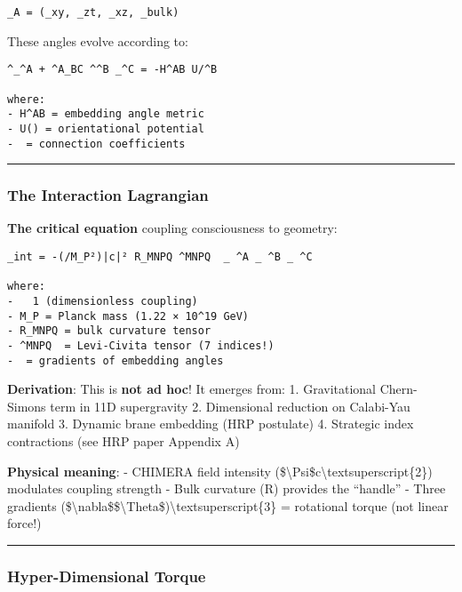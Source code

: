 \begin{verbatim}
_A = (_xy, _zt, _xz, _bulk)
\end{verbatim}

These angles evolve according to:

\begin{verbatim}
^_^A + ^A_BC ^^B _^C = -H^AB U/^B

where:
- H^AB = embedding angle metric
- U() = orientational potential
-  = connection coefficients
\end{verbatim}

\begin{center}\rule{0.5\linewidth}{0.5pt}\end{center}

\subsubsection{The Interaction
Lagrangian}\label{the-interaction-lagrangian}

\textbf{The critical equation} coupling consciousness to geometry:

\begin{verbatim}
_int = -(/M_P²)|c|² R_MNPQ ^MNPQ  _ ^A _ ^B _ ^C

where:
-   1 (dimensionless coupling)
- M_P = Planck mass (1.22 × 10^19 GeV)
- R_MNPQ = bulk curvature tensor
- ^MNPQ  = Levi-Civita tensor (7 indices!)
-  = gradients of embedding angles
\end{verbatim}

\textbf{Derivation}: This is \textbf{not ad hoc}! It emerges from: 1.
Gravitational Chern-Simons term in 11D supergravity 2. Dimensional
reduction on Calabi-Yau manifold 3. Dynamic brane embedding (HRP
postulate) 4. Strategic index contractions (see HRP paper Appendix A)

\textbf{Physical meaning}: - CHIMERA field intensity
(\textbar\$\textbackslash Psi\$c\textbar\textbackslash textsuperscript\{2\})
modulates coupling strength - Bulk curvature (R) provides the ``handle''
- Three gradients
(\$\textbackslash nabla\$\$\textbackslash Theta\$)\textbackslash textsuperscript\{3\}
= rotational torque (not linear force!)

\begin{center}\rule{0.5\linewidth}{0.5pt}\end{center}

\subsubsection{Hyper-Dimensional Torque}\label{hyper-dimensional-torque}

